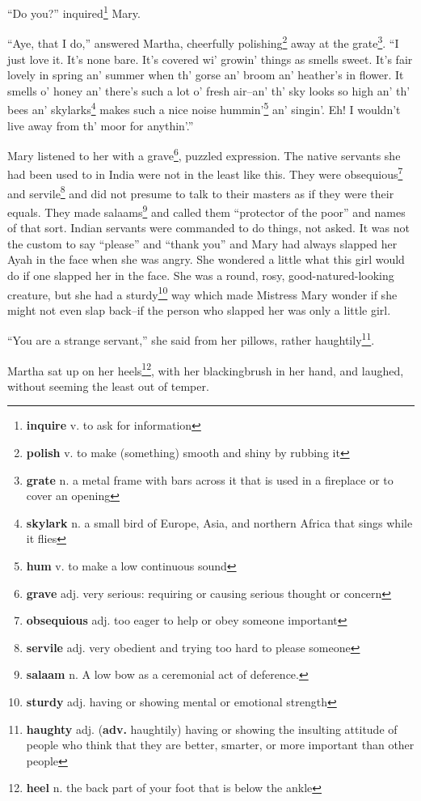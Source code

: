 ``Do you?'' inquired\footnote{\textbf{inquire} v. to ask for information} Mary.

``Aye, that I do,'' answered Martha, cheerfully polishing\footnote{\textbf{polish} v. to make (something) smooth and shiny by rubbing it} away at the grate\footnote{\textbf{grate} n. a metal frame with bars across it that is used in a fireplace or to cover an opening}. ``I just love it. It's none bare. It's covered wi' growin' things as smells sweet. It's fair lovely in spring an' summer when th' gorse an' broom an' heather's in flower. It smells o' honey an' there's such a lot o' fresh air--an' th' sky looks so high an' th' bees an' skylarks\footnote{\textbf{skylark} n. a small bird of Europe, Asia, and northern Africa that sings while it flies} makes such a nice noise hummin'\footnote{\textbf{hum} v. to make a low continuous sound} an' singin'. Eh! I wouldn't live away from th' moor for anythin'.''

Mary listened to her with a grave\footnote{\textbf{grave} adj. very serious: requiring or causing serious thought or concern}, puzzled expression. The native servants she had been used to in India were not in the least like this. They were obsequious\footnote{\textbf{obsequious} adj. too eager to help or obey someone important} and servile\footnote{\textbf{servile} adj. very obedient and trying too hard to please someone} and did not presume to talk to their masters as if they were their equals. They made salaams\footnote{\textbf{salaam} n. A low bow as a ceremonial act of deference.} and called them ``protector of the poor'' and names of that sort. Indian servants were commanded to do things, not asked. It was not the custom to say ``please'' and ``thank you'' and Mary had always slapped her Ayah in the face when she was angry. She wondered a little what this girl would do if one slapped her in the face. She was a round, rosy, good-natured-looking creature, but she had a sturdy\footnote{\textbf{sturdy} adj. having or showing mental or emotional strength} way which made Mistress Mary wonder if she might not even slap back--if the person who slapped her was only a little girl.

``You are a strange servant,'' she said from her pillows, rather haughtily\footnote{\textbf{haughty} adj. (\textbf{adv.} haughtily) having or showing the insulting attitude of people who think that they are better, smarter, or more important than other people}.

Martha sat up on her heels\footnote{\textbf{heel} n. the back part of your foot that is below the ankle}, with her blackingbrush in her hand, and laughed, without seeming the least out of temper.

